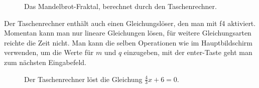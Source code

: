 \documentclass[12pt, a4paper]{report}
\begin{document}
\begin{figure}[H]
\centering
{}
\caption{Das Mandelbrot-Fraktal, berechnet durch den Taschenrechner.}
\end{figure}

\newpage

\noindent
Der Taschenrechner enthält auch einen Gleichungslöser, den man mit f4 aktiviert. Momentan kann man nur lineare Gleichungen lösen, für weitere Gleichungsarten reichte die Zeit nicht. Man kann die selben Operationen wie im Hauptbildschirm verwenden, um die Werte für $m$ und $q$ einzugeben, mit der enter-Taste geht man zum nächsten Eingabefeld.

\begin{figure}[H]
\caption{Der Taschenrechner löst die Gleichung $\frac{4}{3}x+6=0.$}
\end{figure}
\end{document}
